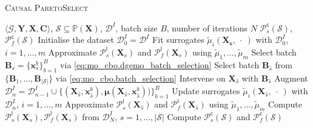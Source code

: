 \begin{algorithm}[tb]
   \caption{\textsc{Causal ParetoSelect}}
   \label{alg:cps}
\begin{algorithmic}
    $\langle \mathcal{G}, \mathbf{Y}, \mathbf{X}, \mathbf{C} \rangle$, $\mathcal{S} \subseteq \mathbb{P}(\mathbf{X})$, $\mathcal{D}^{I}$, batch size $B$, number of iterations $N$
    $\mathcal{P}_s^{\textsf{c}}(\mathcal{S})$, $\mathcal{P}_f^{\textsf{c}}(\mathcal{S})$
   \STATE Initialise the dataset $\mathcal{D}_0^{I}=\mathcal{D}^{I}$
   \STATE Fit surrogates $\tilde{\mu}_i(\mathbf{X_s}, \ \cdot \ )$ with $\mathcal{D}_0^{I}$, $i=1,\dots,m$
   \STATE Approximate $\mathcal{P}_s^{\textsf{l}}(\mathbf{X}_s)$ and $\mathcal{P}_f^{\textsf{l}}(\mathbf{X}_s)$ using $\tilde{\mu}_1,\dots,\tilde{\mu}_m$
   \ENDFOR
   \STATE Select batch $\mathbf{B}_s = \{\mathbf{x}_{s}^{b}\}_{b=1}^B$ via \cref{eq:mo_cbo.dgemo_batch_selection}
   \ENDFOR
   \STATE Select batch $\mathbf{B}_{\hat{s}}$ from $\{ \mathbf{B}_1, \dots, \mathbf{B}_{|\mathcal{S}|} \}$ via \cref{eq:mo_cbo.batch_selection}
   \STATE Intervene on $\mathbf{X}_{\hat{s}}$ with $\mathbf{B}_{\hat{s}}$
   \STATE Augment $\mathcal{D}_n^{I} = \mathcal{D}_{n-1}^{I} \cup \{(\mathbf{X}_{\hat{s}},\mathbf{x}_{\hat{s}}^b),\boldsymbol{\mu}(\mathbf{X}_{\hat{s}}, \mathbf{x}_{\hat{s}}^b))\}_{b=1}^B$
   \STATE Update surrogates $\tilde{\mu}_i(\mathbf{X}_{\hat{s}}, \ \cdot \ )$ with $\mathcal{D}_{n}^{I}$, $i=1,\dots,m$
   \STATE Approximate $\mathcal{P}_s^{\textsf{l}}(\mathbf{X}_{\hat{s}})$ and $\mathcal{P}_f^{\textsf{l}}(\mathbf{X}_{\hat{s}})$ using $\tilde{\mu}_1,\dots,\tilde{\mu}_m$
   \ENDFOR
   \STATE Compute $\mathcal{P}_s^{\textsf{l}}(\mathbf{X}_s), \mathcal{P}_f^{\textsf{l}}(\mathbf{X}_s)$ from $\mathcal{D}_N^{I}$, $s=1,\dots, |\mathcal{S}|$
   \STATE Compute $\mathcal{P}^{\textsf{c}}_s(\mathcal{S})$ and $\mathcal{P}^{\textsf{c}}_f(\mathcal{S})$ 
\end{algorithmic}
\end{algorithm}

